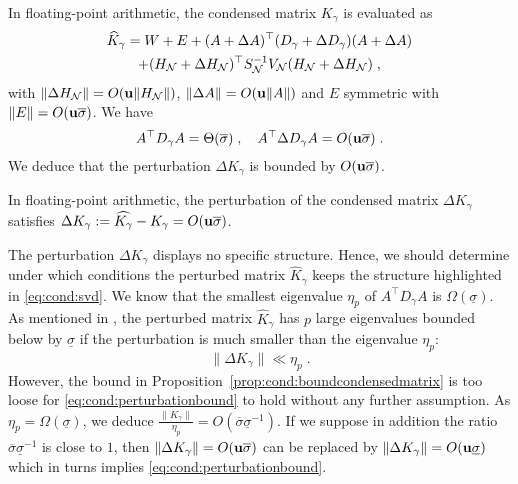 In floating-point arithmetic, the condensed matrix $K_\gamma$ is evaluated as
\begin{multline*}
  \widehat{K}_\gamma = W + E + (A + \Delta A)^\top (D_\gamma + \Delta D_\gamma) (A + \Delta A) \\
  + (H_{\mathcal{N}} + \Delta H_{\mathcal{N}})^\top S_{\mathcal{N}}^{-1} V_{\mathcal{N}} (H_{\mathcal{N}} + \Delta H_{\mathcal{N}}) \; ,
\end{multline*}
with $\| \Delta H_{\mathcal{N}} \| = O(\mathbf{u} \| H_{\mathcal{N}}\|)$, $\| \Delta A \| = O(\mathbf{u} \| A\|)$
and $E$ symmetric with $\|E \| = O(\mathbf{u} \overline{\sigma})$.
We have
\begin{equation}
A^\top D_\gamma A = \Theta(\overline{\sigma}) \; , \quad
A^\top \Delta D_\gamma A = O(\mathbf{u} \overline{\sigma}) \; .
\end{equation}
We deduce that the perturbation $\Delta K_\gamma$ is bounded by $O(\mathbf{u} \overline{\sigma})$.
\begin{proposition}
  \label{prop:cond:boundcondensedmatrix}
  In floating-point arithmetic, the perturbation
  of the condensed matrix $\Delta K_\gamma$ satisfies
  $\Delta K_\gamma := \widehat{K_\gamma} - K_\gamma  = O(\mathbf{u} \overline{\sigma})$.
\end{proposition}
The perturbation $\Delta K_\gamma$ displays no specific structure.
Hence, we should determine under which
conditions the perturbed matrix $\widehat{K}_\gamma$
keeps the structure highlighted in \eqref{eq:cond:svd}.
We know that the smallest eigenvalue $\eta_p$ of $A^\top D_\gamma A$
is $\Omega(\underline{\sigma})$. As mentioned in
\cite[Section 3.4.2]{wright1998ill}, the perturbed matrix
$\widehat{K}_\gamma$ has $p$ large eigenvalues
bounded below by $\underline{\sigma}$ if the perturbation
is much smaller than the eigenvalue $\eta_p$:
\begin{equation}
  \label{eq:cond:perturbationbound}
  \| \Delta K_\gamma \| \ll \eta_p  \; .
\end{equation}
However, the bound in Proposition~\ref{prop:cond:boundcondensedmatrix} is too loose
for \eqref{eq:cond:perturbationbound} to hold without any further assumption.
As $\eta_p = \Omega(\underline{\sigma})$, we deduce $\frac{\|K_\gamma \|}{\eta_p}
= O(\overline{\sigma}\underline{\sigma}^{-1})$.
If we suppose in addition the ratio $\overline{\sigma}\underline{\sigma}^{-1}$ is close to $1$,
then $\|\Delta K_\gamma\| = O(\mathbf{u} \overline{\sigma})$ can be replaced by
$\| \Delta K_\gamma\|= O(\mathbf{u} \underline{\sigma})$ which in turns implies \eqref{eq:cond:perturbationbound}.

